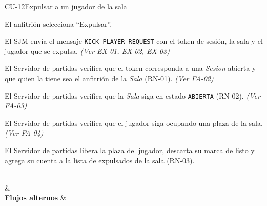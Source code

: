 \begin{fichacu}{CU-12}{Expulsar a un jugador de la sala}
{\begin{cuenum}[start=1]
      \item El anfitrión selecciona ``Expulsar''.
      \item El SJM envía el mensaje \texttt{KICK\_\allowbreak{}PLAYER\_\allowbreak{}REQUEST} con el token de sesión, la sala y el jugador que se expulsa. \textit{(Ver \mbox{EX-01}, \mbox{EX-02}, \mbox{EX-03})}
      \item El Servidor de partidas verifica que el token corresponda a una \textit{Sesion} abierta y que quien la tiene sea el anfitrión de la \textit{Sala} (\mbox{RN-01}). \textit{(Ver \mbox{FA-02})}
      \item El Servidor de partidas verifica que la \textit{Sala} siga en estado \texttt{ABIERTA} (\mbox{RN-02}). \textit{(Ver \mbox{FA-03})}
      \item El Servidor de partidas verifica que el jugador siga ocupando una plaza de la sala. \textit{(Ver \mbox{FA-04})}
      \item El Servidor de partidas libera la plaza del jugador, descarta su marca de listo y agrega su cuenta a la lista de expulsados de la sala (\mbox{RN-03}).
    \end{cuenum}} \\
   &  \\ \hline
  \textbf{Flujos alternos} & 
\end{fichacu}
